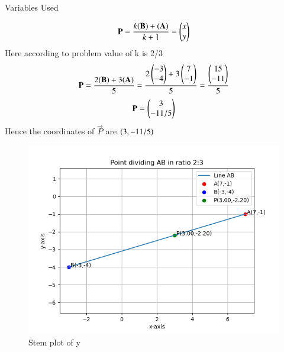 \documentclass[journal]{IEEEtran}
\begin{document}
\begin{table}[h!]    
  \centering
  
  \caption{Variables Used}
  \label{tab10.5.3.9.1}
\end{table}
\begin{align}
\mathbf{P}=\frac{k(\mathbf{B})+(\mathbf{A})}{k+1}=\begin{pmatrix}x\\y\end{pmatrix}\\
\end{align}
Here according to problem value of k is 2/3\\
\begin{align}
\mathbf{P}=\frac{2(\mathbf{B})+3(\mathbf{A})}{5}=\frac{2\begin{pmatrix}-3\\-4\end{pmatrix}+3\begin{pmatrix}7\\-1\end{pmatrix}}{5}=\frac{\begin{pmatrix}15\\-11\end{pmatrix}}{5}\\
\end{align}
\begin{align}
\mathbf{P}=\begin{pmatrix}3\\-11/5\end{pmatrix}
\end{align}
Hence the coordinates of $\vec{P}$ are $\left(3,-11/5\right)$
\begin{figure}
    \centering
    \includegraphics[width=0.7\linewidth]{figs/plot.png}
    \caption{Stem plot of y}
    \label{stemplot}
\end{figure}
\end{document}
